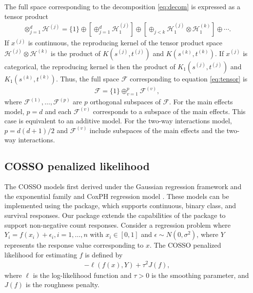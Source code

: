 The full space corresponding to the decomposition \eqref{eq:decom} is expressed as a tensor product
\begin{align}
    \otimes_{j=1}^{d} \mathcal{H}^{(j)} = \{1\} \oplus 
    \left[ \oplus_{j=1}^{d} \mathcal{H}_1^{(j)} \right] \oplus \left[ \oplus_{j<k} \mathcal{H}_1^{(j)} \otimes \mathcal{H}_1^{(k)} \right] \oplus \cdots.
    \label{eq:tensor} 
\end{align}
If \(x^{(j)}\) is continuous, the reproducing kernel of the tensor product space \(\mathcal{H}^{(j)} \otimes \mathcal{H}^{(k)}\) is the product of \(K(s^{(j)},t^{(j)})\) and \(K(s^{(k)},t^{(k)})\). If \(x^{(j)}\) is categorical, the reproducing kernel is then the product of \(K_1(s^{(j)},t^{(j)})\) and \(K_1(s^{(k)},t^{(k)})\). Thus, the full space \(\mathcal{F}\) corresponding to equation \eqref{eq:tensor} is
\begin{align}
    \mathcal{F} = \{1\} \oplus_{v=1}^{p} \mathcal{F}^{(v)},
    \label{eq:full-decom} 
\end{align}
where \(\mathcal{F}^{(1)}, \dots, \mathcal{F}^{(p)}\) are \(p\) orthogonal subspaces of \(\mathcal{F}\). For the main effects model, \(p = d\) and each \(\mathcal{F}^{(v)}\) corresponds to a subspace of the main effects. This case is equivalent to an additive model. For the two-way interactions model, \(p = d(d+1)/2\) and \(\mathcal{F}^{(v)}\) include subspaces of the main effects and the two-way interactions.

\hypertarget{ssec2_2}{%
\subsection{COSSO penalized likelihood}\label{ssec2_2}}

The COSSO models first derived under the Gaussian regression framework \citep{Lin:2006} and the exponential family \citep{Zhang:2006} and CoxPH regression model \citep{Leng:2006}. These models can be implemented using the  package, which supports continuous, binary class, and survival responses. Our package extends the capabilities of the  package to support non-negative count responses. Consider a regression problem where \(Y_i=f(x_i) + \epsilon_i, i = 1,\dots, n\) with \(x_i \in [0, 1]\) and \(\epsilon \sim N(0, \sigma^2)\), where \(Y\) represents the response value corresponding to \(x\). The COSSO penalized likelihood for estimating \(f\) is defined by
\begin{align}
    -\ell(f(x), Y) + \tau^2 J(f),
    \label{eq:cosso} 
\end{align}
where \(\ell\) is the log-likelihood function and \(\tau>0\) is the smoothing parameter, and \(J(f)\) is the roughness penalty.

